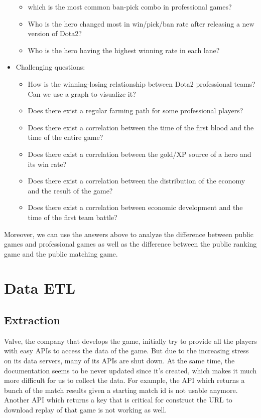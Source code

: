 \documentclass{article}
\begin{document}
\begin{itemize}
\begin{itemize}
        \item which is the most common ban-pick combo in professional games?
        \item Who is the hero changed most in win/pick/ban rate after releasing a new version of Dota2?
        \item Who is the hero having the highest winning rate in each lane?
    \end{itemize}
    \item Challenging questions:
    \begin{itemize}
        \item How is the winning-losing relationship between Dota2 professional teams? Can we use a graph to visualize it?
        \item Does there exist a regular farming path for some professional players?
        \item Does there exist a correlation between the time of the first blood and the time of the entire game?
        \item Does there exist a correlation between the gold/XP source of a hero and its win rate?
        \item Does there exist a correlation between the distribution of the economy and the result of the game?
        \item Does there exist a correlation between economic development and the time of the first team battle?
    \end{itemize}
\end{itemize}

Moreover, we can use the answers above to analyze the difference between public games and professional games as well as the difference between the public ranking game and the public matching game.


\section{Data ETL}

\subsection{Extraction}

Valve, the company that develops the game, initially try to provide all the players with easy APIs to access the data of the game.
But due to the increasing stress on its data servers, many of its APIs are shut down.
At the same time, the documentation seems to be never updated since it's created, which makes it much more difficult for us to collect the data.
For example, the API which returns a bunch of the match results given a starting match id is not usable anymore.
Another API which returns a key that is critical for construct the URL to download replay of that game is not working as well.
\end{document}
